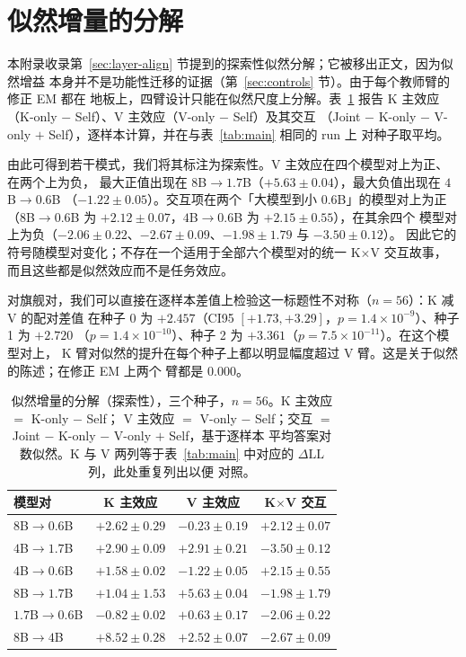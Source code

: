 \documentclass[11pt]{article}
\newcommand{\dll}{\Delta\text{LL}}
\begin{document}
\section{似然增量的分解}
\label{app:factorial}
本附录收录第~\ref{sec:layer-align} 节提到的探索性似然分解；它被移出正文，因为似然增益
本身并不是功能性迁移的证据（第~\ref{sec:controls} 节）。由于每个教师臂的修正 EM 都在
地板上，四臂设计只能在似然尺度上分解。表~\ref{tab:factorial} 报告 K 主效应
（K-only $-$ Self）、V 主效应（V-only $-$ Self）及其交互
（Joint $-$ K-only $-$ V-only $+$ Self），逐样本计算，并在与表~\ref{tab:main} 相同的 run 上
对种子取平均。

由此可得到若干模式，我们将其标注为探索性。V 主效应在四个模型对上为正、在两个上为负，
最大正值出现在 $8$B$\to1.7$B（$+5.63 \pm 0.04$），最大负值出现在 $4$B$\to0.6$B
（$-1.22 \pm 0.05$）。交互项在两个「大模型到小 $0.6$B」的模型对上为正
（$8$B$\to0.6$B 为 $+2.12 \pm 0.07$，$4$B$\to0.6$B 为 $+2.15 \pm 0.55$），在其余四个
模型对上为负（$-2.06 \pm 0.22$、$-2.67 \pm 0.09$、$-1.98 \pm 1.79$ 与 $-3.50 \pm 0.12$）。
因此它的符号随模型对变化；不存在一个适用于全部六个模型对的统一 K$\times$V 交互故事，
而且这些都是似然效应而不是任务效应。

对旗舰对，我们可以直接在逐样本差值上检验这一标题性不对称（$n=56$）：K 减 V 的配对差值
在种子 0 为 $+2.457$（CI95 $[+1.73, +3.29]$，$p=1.4\times10^{-9}$）、种子 1 为 $+2.720$
（$p=1.4\times10^{-10}$）、种子 2 为 $+3.361$（$p=7.5\times10^{-11}$）。在这个模型对上，
K 臂对似然的提升在每个种子上都以明显幅度超过 V 臂。这是关于似然的陈述；在修正 EM 上两个
臂都是 $0.000$。

\begin{table}[t]
\centering
\small
\caption{似然增量的分解（探索性），三个种子，$n=56$。K 主效应 $=$ K-only $-$ Self；
V 主效应 $=$ V-only $-$ Self；交互 $=$ Joint $-$ K-only $-$ V-only $+$ Self，基于逐样本
平均答案对数似然。K 与 V 两列等于表~\ref{tab:main} 中对应的 $\dll$ 列，此处重复列出以便
对照。}
\label{tab:factorial}
\begin{tabular}{lccc}
\toprule
模型对 & K 主效应 & V 主效应 & K$\times$V 交互 \\
\midrule
$8$B$\to0.6$B   & $+2.62{\pm}0.29$ & $-0.23{\pm}0.19$ & $+2.12{\pm}0.07$ \\
$4$B$\to1.7$B   & $+2.90{\pm}0.09$ & $+2.91{\pm}0.21$ & $-3.50{\pm}0.12$ \\
$4$B$\to0.6$B   & $+1.58{\pm}0.02$ & $-1.22{\pm}0.05$ & $+2.15{\pm}0.55$ \\
$8$B$\to1.7$B   & $+1.04{\pm}1.53$ & $+5.63{\pm}0.04$ & $-1.98{\pm}1.79$ \\
$1.7$B$\to0.6$B & $-0.82{\pm}0.02$ & $+0.63{\pm}0.17$ & $-2.06{\pm}0.22$ \\
$8$B$\to4$B     & $+8.52{\pm}0.28$ & $+2.52{\pm}0.07$ & $-2.67{\pm}0.09$ \\
\bottomrule
\end{tabular}
\end{table}
\end{document}
